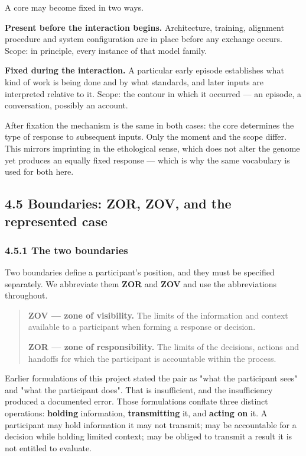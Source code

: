 A core may become fixed in two ways.

\textbf{Present before the interaction begins.} Architecture, training, alignment procedure and system configuration are in place before any exchange occurs. Scope: in principle, every instance of that model family.

\textbf{Fixed during the interaction.} A particular early episode establishes what kind of work is being done and by what standards, and later inputs are interpreted relative to it. Scope: the contour in which it occurred — an episode, a conversation, possibly an account.

After fixation the mechanism is the same in both cases: the core determines the type of response to subsequent inputs. Only the moment and the scope differ. This mirrors imprinting in the ethological sense, which does not alter the genome yet produces an equally fixed response — which is why the same vocabulary is used for both here.


\subsection*{4.5 Boundaries: ZOR, ZOV, and the represented case}
\label{sec:en:4.5}


\subsubsection*{4.5.1 The two boundaries}
\label{sec:en:4.5.1}

Two boundaries define a participant's position, and they must be specified separately. We abbreviate them \textbf{ZOR} and \textbf{ZOV} and use the abbreviations throughout.

\begin{quote}
\textbf{ZOV — zone of visibility.} The limits of the information and context available to a participant when forming a response or decision.

\textbf{ZOR — zone of responsibility.} The limits of the decisions, actions and handoffs for which the participant is accountable within the process.
\end{quote}
Earlier formulations of this project stated the pair as "what the participant sees" and "what the participant does". That is insufficient, and the insufficiency produced a documented error. Those formulations conflate three distinct operations: \textbf{holding} information, \textbf{transmitting} it, and \textbf{acting on} it. A participant may hold information it may not transmit; may be accountable for a decision while holding limited context; may be obliged to transmit a result it is not entitled to evaluate.


